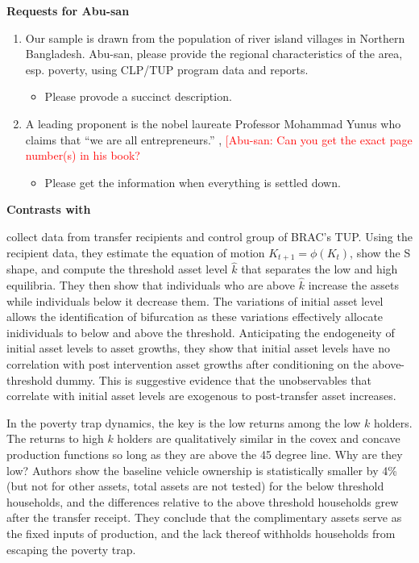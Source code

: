 \textbf{Requests for Abu-san}
\begin{enumerate}
\vspace{1.0ex}\setlength{\itemsep}{1.0ex}\setlength{\baselineskip}{12pt}
\item		Our sample is drawn from the population of river island villages in Northern Bangladesh. Abu-san, please provide the regional characteristics of the area, esp. poverty, using CLP/TUP program data and reports. 
	\begin{itemize}
	\vspace{1.0ex}\setlength{\itemsep}{1.0ex}\setlength{\baselineskip}{12pt}
	\item	Please provode a succinct description.
	\end{itemize}
\item	A leading proponent is the nobel laureate Professor Mohammad Yunus who claims that ``we are all entrepreneurs.'' \citet{Yunus2003}, \citet{Cosic2017} \textcolor{red}{[Abu-san: Can you get the exact page number(s) in his book?}
	\begin{itemize}
	\vspace{1.0ex}\setlength{\itemsep}{1.0ex}\setlength{\baselineskip}{12pt}
	\item	Please get the information when everything is settled down.
	\end{itemize}
\end{enumerate}


\textbf{\textbf{Contrasts with \citet{Balboni2020}}}
\setlength{\parindent}{1em}

	\citet{Balboni2020} collect data from transfer recipients and control group of BRAC's TUP. Using the recipient data, they estimate the equation of motion $K_{t+1}=\phi(K_{t})$, show the S shape, and compute the threshold asset level $\hat{k}$ that separates the low and high equilibria. They then show that individuals who are above $\hat{k}$ increase the assets while individuals below it decrease them. The variations of initial asset level allows the identification of bifurcation as these variations effectively allocate inidividuals to below and above the threshold. Anticipating the endogeneity of initial asset levels to asset growths, they show that initial asset levels have no correlation with post intervention asset growths after conditioning on the above-threshold dummy. This is suggestive evidence that the unobservables that correlate with initial asset levels are exogenous to post-transfer asset increases.

	In the poverty trap dynamics, the key is the low returns among the low $k$ holders. The returns to high $k$ holders are qualitatively similar in the covex and concave production functions so long as they are above the 45 degree line. Why are they low? Authors show the baseline vehicle ownership is statistically smaller by 4\% (but not for other assets, total assets are not tested) for the below threshold households, and the differences relative to the above threshold households grew after the transfer receipt. They conclude that the complimentary assets serve as the fixed inputs of production, and the lack thereof withholds households from escaping the poverty trap.

